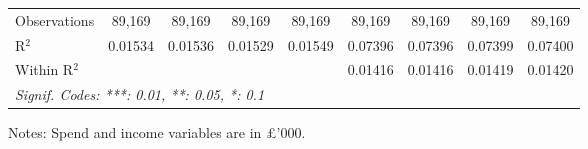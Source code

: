 \begin{table}[htbp]
\begin{threeparttable}[b]
\begin{tabular}{lcccccccc}
         Observations             & 89,169           & 89,169           & 89,169           & 89,169           & 89,169           & 89,169           & 89,169           & 89,169\\  
         R$^2$                    & 0.01534          & 0.01536          & 0.01529          & 0.01549          & 0.07396          & 0.07396          & 0.07399          & 0.07400\\  
         Within R$^2$             &                  &                  &                  &                  & 0.01416          & 0.01416          & 0.01419          & 0.01420\\  
         \midrule \midrule
         \multicolumn{9}{l}{\emph{Signif. Codes: ***: 0.01, **: 0.05, *: 0.1}}\\
      \end{tabular}
      
      \begin{tablenotes}\footnotesize
         \item Notes: Spend and income variables are in \pounds'000.
      \end{tablenotes}
   \end{threeparttable}
\end{table}


